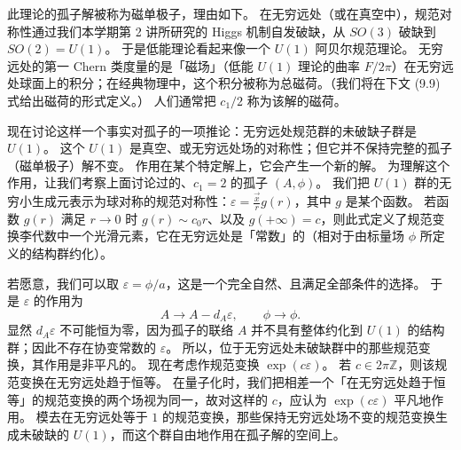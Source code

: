 此理论的孤子解被称为磁单极子，理由如下。
在无穷远处（或在真空中），规范对称性通过我们本学期第 2 讲所研究的 Higgs 机制自发破缺，从 $SO(3)$ 破缺到 $SO(2)=U(1)$。
于是低能理论看起来像一个 $U(1)$ 阿贝尔规范理论。
无穷远处的第一 Chern 类度量的是「磁场」（低能 $U(1)$ 理论的曲率 $F/2\pi$）在无穷远处球面上的积分；在经典物理中，这个积分被称为总磁荷。（我们将在下文 (9.9) 式给出磁荷的形式定义。）
人们通常把 $c_1/2$ 称为该解的磁荷。

现在讨论这样一个事实对孤子的一项推论：无穷远处规范群的未破缺子群是 $U(1)$。
这个 $U(1)$ 是真空、或无穷远处场的对称性；但它并不保持完整的孤子（磁单极子）解不变。
作用在某个特定解上，它会产生一个新的解。
为理解这个作用，让我们考察上面讨论过的、$c_1=2$ 的孤子 $(A,\phi)$。
我们把 $U(1)$ 群的无穷小生成元表示为球对称的规范对称性：$\varepsilon=\frac{\vec x}{r}g(r)$，其中 $g$ 是某个函数。
若函数 $g(r)$ 满足 $r\to0$ 时 $g(r)\sim c_0r$、以及 $g(+\infty)=c$，则此式定义了规范变换李代数中一个光滑元素，它在无穷远处是「常数」的（相对于由标量场 $\phi$ 所定义的结构群约化）。

若愿意，我们可以取 $\varepsilon=\phi/a$，这是一个完全自然、且满足全部条件的选择。
于是 $\varepsilon$ 的作用为
\begin{equation}
  \tag{9.6}
  \label{eq:9-6}
  A\to A-d_A\varepsilon,\qquad \phi\to\phi.
\end{equation}
显然 $d_A\varepsilon$ 不可能恒为零，因为孤子的联络 $A$ 并不具有整体约化到 $U(1)$ 的结构群；因此不存在协变常数的 $\varepsilon$。
所以，位于无穷远处未破缺群中的那些规范变换，其作用是非平凡的。
现在考虑作规范变换 $\exp(c\varepsilon)$。
若 $c\in2\pi\mathbb{Z}$，则该规范变换在无穷远处趋于恒等。
在量子化时，我们把相差一个「在无穷远处趋于恒等」的规范变换的两个场视为同一，故对这样的 $c$，应认为 $\exp(c\varepsilon)$ 平凡地作用。
模去在无穷远处等于 $1$ 的规范变换，那些保持无穷远处场不变的规范变换生成未破缺的 $U(1)$，而这个群自由地作用在孤子解的空间上。



